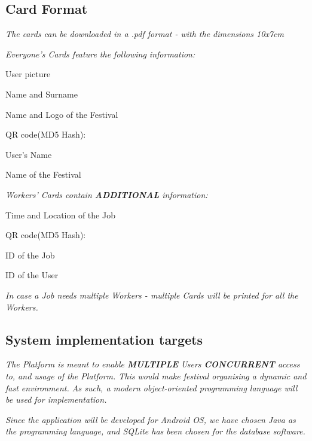 		\subsection{Card Format}
		\textit{The cards can be downloaded in a .pdf format - with the dimensions 10x7cm}
	
		\textit{Everyone's Cards feature the following information:}
		\begin{packed_enum}
			\item User picture
			\item Name and Surname
			\item Name and Logo of the Festival
			\item QR code(MD5 Hash):
			\item[] \begin{packed_enum}
				\item User's Name
				\item Name of the Festival
			\end{packed_enum}
		\end{packed_enum}
			
		\textit{Workers' Cards contain \textbf{ADDITIONAL} information:}
		\begin{packed_enum}
			\item Time and Location of the Job
			\item QR code(MD5 Hash):
			\item[] \begin{packed_enum}
				\item ID of the Job
				\item ID of the User
			\end{packed_enum}
		\end{packed_enum}
	
		\textit{In case a Job needs multiple Workers - multiple Cards will be printed for all the Workers.}
	\subsection{System implementation targets}
	
	\textit{The Platform is meant to enable \textbf{MULTIPLE} Users \textbf{CONCURRENT} access to, and usage of the Platform. This would make festival organising a dynamic and fast environment. As such, a modern object-oriented programming language will be used for implementation.}
	
	\textit{Since the application will be developed for Android OS, we have chosen Java as the programming language, and SQLite has been chosen for the database software.}
	
